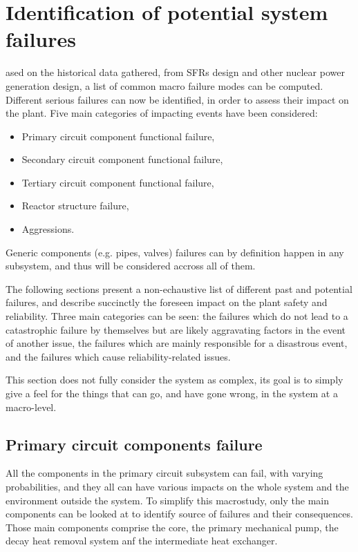 %
%
\let\textcircled=\pgftextcircled
\chapter{Identification of potential system failures}
\label{chap:potential_failures}

ased on the historical data gathered, from SFRs design and other nuclear power generation design, a list of common macro failure modes can be computed. Different serious failures can now be identified, in order to assess their impact on the plant. Five main categories of impacting events have been considered:

\begin{itemize}
\item Primary circuit component functional failure,
\item Secondary circuit component functional failure,
\item Tertiary circuit component functional failure,
\item Reactor structure failure,
\item Aggressions.
\end{itemize}

Generic components (e.g. pipes, valves) failures can by definition happen in any subsystem, and thus will be considered accross all of them.

The following sections present a non-echaustive list of different past and potential failures, and describe succinctly the foreseen impact on the plant safety and reliability. Three main categories can be seen: the failures which do not lead to a catastrophic failure by themselves but are likely aggravating factors in the event of another issue, the failures which are mainly responsible for a disastrous event, and the failures which cause reliability-related issues.

This section does not fully consider the system as complex, its goal is to simply give a feel for the things that can go, and have gone wrong, in the system at a macro-level.


\section{Primary circuit components failure}
\label{sec3:primary_failures}

All the components in the primary circuit subsystem can fail, with varying probabilities, and they all can have various impacts on the whole system and the environment outside the system. To simplify this macrostudy, only the main components can be looked at to identify source of failures and their consequences. Those main components comprise the core, the primary mechanical pump, the decay heat removal system anf the intermediate heat exchanger.


